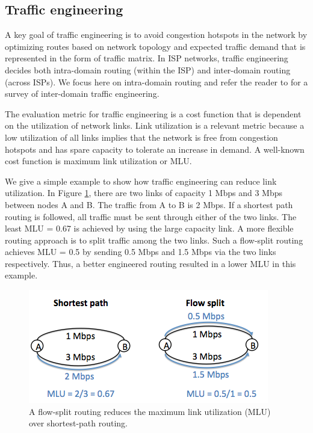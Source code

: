 \subsection{Traffic engineering}
\label{sec:ch2-te}

A key goal of traffic engineering is to avoid congestion hotspots in the network by optimizing routes based on network topology and expected traffic demand that is represented in the form of traffic matrix. In ISP networks, traffic engineering decides both intra-domain routing (within the ISP) and inter-domain routing (across ISPs). We focus here on intra-domain routing and refer the reader to  \cite{Feamster2003,rexford} for a survey of inter-domain traffic engineering. 

The evaluation metric for traffic engineering is a cost function that is dependent on the utilization of network links. Link utilization is a relevant metric because a low utilization of all links implies that the network is free from congestion hotspots and has spare capacity to tolerate an increase in demand. A well-known cost function is maximum link utilization or MLU. 

We give a simple example to show how traffic engineering can reduce link utilization. In Figure \ref{fig:te-example}, there are two links of capacity 1 Mbps and 3 Mbps between nodes A and B. The traffic from A to B is 2 Mbps. If a shortest path routing is followed, all traffic must be sent through either of the two links. The least MLU = 0.67 is achieved by using the large capacity link. A more flexible routing approach is to split traffic among the two links. Such a flow-split routing achieves MLU = 0.5 by sending 0.5 Mbps and 1.5 Mbps via the two links respectively. Thus, a better engineered routing resulted in a lower MLU in this example.

\begin{figure}
	\centering
	\includegraphics[scale=0.6]{fig/te-example.png}
	\caption{A flow-split routing reduces the maximum link utilization (MLU) over shortest-path routing.}
	\label{fig:te-example}
\end{figure}

